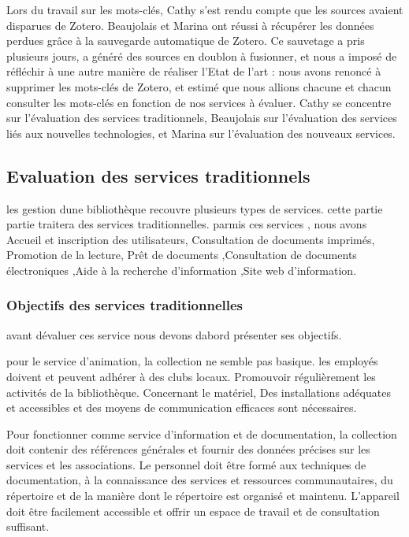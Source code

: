 \documentclass[french,a4paper,12pt]{article}
\begin{document}
\quad Lors du travail sur les mots-clés, Cathy s’est rendu compte que les sources avaient disparues de Zotero. Beaujolais et Marina ont réussi à récupérer les données perdues grâce à la sauvegarde automatique de Zotero. Ce sauvetage a pris plusieurs jours, a généré des sources en doublon à fusionner, et nous a imposé de réfléchir à une autre manière de réaliser l’Etat de l'art : nous avons renoncé à supprimer les mots-clés de Zotero, et estimé que nous allions chacune et chacun consulter les mots-clés en fonction de nos services à évaluer. 
Cathy se concentre sur l’évaluation des services traditionnels, Beaujolais sur l’évaluation des services liés aux nouvelles technologies, et Marina sur l’évaluation des nouveaux services.\\
\quad 



\subsection{Evaluation des services traditionnels}


\quad les gestion dune bibliothèque recouvre plusieurs types de services. cette partie partie traitera des services traditionnelles. parmis ces services , nous avons Accueil et inscription des utilisateurs, Consultation de documents imprimés, Promotion de la lecture, Prêt de documents ,Consultation de documents électroniques ,Aide à la recherche d’information ,Site web d’information.  


\subsubsection{Objectifs des services traditionnelles} \citep{Gouyon}

\quad avant dévaluer ces service nous devons dabord présenter ses objectifs.

\quad pour le service  d'animation, la collection ne semble pas basique.  les employés doivent et peuvent adhérer à des clubs locaux. Promouvoir régulièrement les activités de la bibliothèque. Concernant le matériel, Des installations adéquates et accessibles et des moyens de communication efficaces sont nécessaires. 

\quad Pour fonctionner comme service d'information et de documentation, la collection doit contenir des références générales et fournir des données précises sur les services et les associations. Le personnel doit être formé aux techniques de documentation, à la connaissance des services et ressources communautaires, du répertoire et de la manière dont le répertoire est organisé et maintenu. L'appareil doit être facilement accessible et offrir un espace de travail et de consultation suffisant.  
\end{document}

